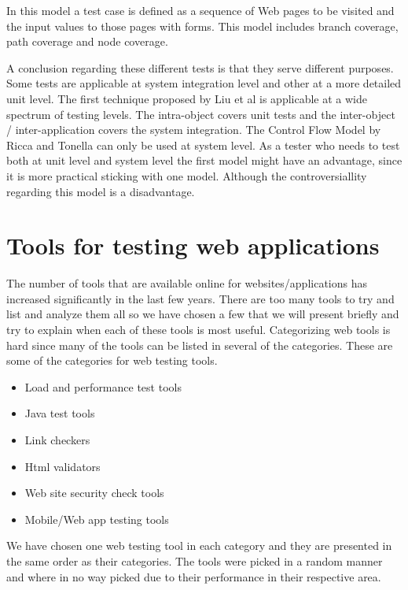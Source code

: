 \documentclass[a4paper]{article}
\begin{document}
In this model a test case is defined as a sequence of Web pages to be visited and the input values to
those pages with forms. This model includes branch coverage, path coverage and node coverage.

A conclusion regarding these different tests is that they serve different purposes. Some tests are
applicable at system integration level and other at a more detailed unit level. The first technique
proposed by Liu et al is applicable at a wide spectrum of testing levels. The intra-object covers unit
tests and the inter-object / inter-application covers the system integration. The Control Flow Model
by Ricca and Tonella can only be used at system level. As a tester who needs to test both at unit level
and system level the first model might have an advantage, since it is more practical sticking with one
model. Although the controversiallity regarding this model is a disadvantage.


\section{Tools for testing web applications}



 The number of tools that are available online for websites/applications has increased significantly in the last few years. There are too many tools to try and list and analyze them all so we have chosen a few that we will present briefly and try to explain when each of these tools is most useful. 
 Categorizing web tools is hard since many of the tools can be listed in several of the categories. These are some of the categories for web testing tools.  

 \begin {itemize}
 \item Load and performance test tools  
 \item Java test tools 
 \item Link checkers 
 \item Html validators 
 \item Web site security check tools 
 \item Mobile/Web app testing tools
 \end {itemize}
 
We have chosen one web testing tool in each category and they are presented in the same order as their categories. 
The tools were picked in a random manner and where in no way picked due to their performance in their respective area.
 
\end{document}
